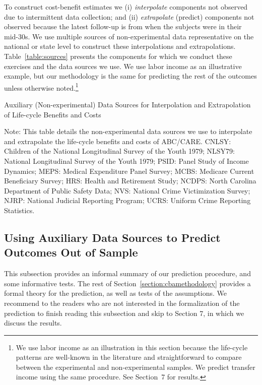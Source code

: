 \noindent To construct cost-benefit estimates we (i) \textit{interpolate} components not observed due to intermittent data collection; and (ii) \textit{extrapolate} (predict) components not observed because the latest follow-up is from when the subjects were in their mid-30s. We use multiple sources of non-experimental data representative on the national or state level to construct these interpolations and extrapolations. Table~\ref{table:sources} presents the components for which we conduct these exercises and the data sources we use. We use labor income as an illustrative example, but our methodology is the same for predicting the rest of the outcomes unless otherwise noted.\footnote{We use labor income as an illustration in this section because the life-cycle patterns are well-known in the literature and straightforward to compare between the experimental and non-experimental samples. We predict transfer income using the same procedure. See Section~7 for results.}

\begin{table}[!htbp]
\begin{threeparttable}
\caption{Auxiliary (Non-experimental) Data Sources for Interpolation and Extrapolation of Life-cycle Benefits and Costs} \label{table:sources}
\footnotesize

\begin{tablenotes}
\footnotesize
Note: This table details the non-experimental data sources we use to interpolate and extrapolate the life-cycle benefits and costs of ABC/CARE. CNLSY: Children of the National Longitudinal Survey of the Youth 1979; NLSY79: National Longitudinal Survey of the Youth 1979; PSID: Panel Study of Income Dynamics; MEPS: Medical Expenditure Panel Survey; MCBS: Medicare Current Beneficiary Survey; HRS: Health and Retirement Study; NCDPS: North Carolina Department of Public Safety Data; NVS: National Crime Victimization Survey; NJRP: National Judicial Reporting Program; UCRS: Uniform Crime Reporting Statistics.
\end{tablenotes}
\end{threeparttable}
\end{table}


\subsection{Using Auxiliary Data Sources to Predict Outcomes Out of Sample}\label{sec:usingaux}

\noindent This subsection provides an informal summary of our prediction procedure, and some informative tests. The rest of Section~\ref{section:cbamethodology} provides a formal theory for the prediction, as well as tests of the assumptions. We recommend to the readers who are not interested in the formalization of the prediction to finish reading this subsection and skip to Section 7, in which we discuss the results.\\

